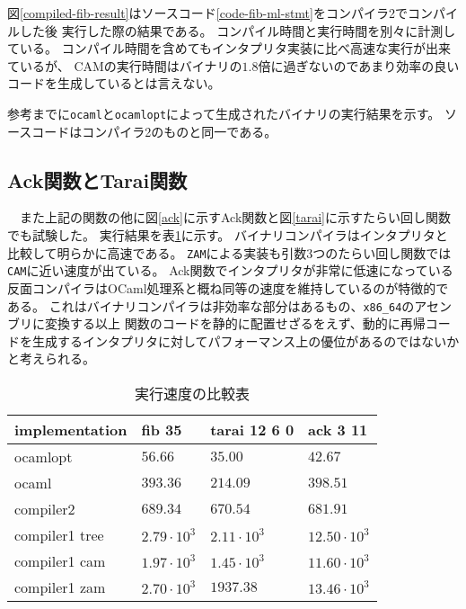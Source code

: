 \documentclass[report]{jlreq}
\begin{document}
      図\ref{compiled-fib-result}はソースコード\ref{code-fib-ml-stmt}をコンパイラ2でコンパイルした後
      実行した際の結果である。
      コンパイル時間と実行時間を別々に計測している。
      コンパイル時間を含めてもインタプリタ実装に比べ高速な実行が出来ているが、
      CAMの実行時間はバイナリの$1.8$倍に過ぎないのであまり効率の良いコードを生成しているとは言えない。
      
      

      参考までに\texttt{ocaml}と\texttt{ocamlopt}によって生成されたバイナリの実行結果を示す。
      ソースコードはコンパイラ2のものと同一である。
      
    \subsection{Ack関数とTarai関数}
    　また上記の関数の他に図\ref{ack}に示すAck関数と図\ref{tarai}に示すたらい回し関数でも試験した。
      実行結果を表\ref{compare-tbl}に示す。
      バイナリコンパイラはインタプリタと比較して明らかに高速である。
	  \texttt{ZAM}による実装も引数3つのたらい回し関数では\texttt{CAM}に近い速度が出ている。
      Ack関数でインタプリタが非常に低速になっている反面コンパイラはOCaml処理系と概ね同等の速度を維持しているのが特徴的である。
      これはバイナリコンパイラは非効率な部分はあるもの、\texttt{x86\_64}のアセンブリに変換する以上
      関数のコードを静的に配置せざるをえず、動的に再帰コードを生成するインタプリタに対してパフォーマンス上の優位があるのではないかと考えられる。
      
      
      \begin{table}[t]
        \centering
        \label{compare-tbl}
        \caption{実行速度の比較表}
        \begin{tabular}{l|lll}
        implementation & fib 35             & tarai 12 6 0         & ack 3 11            \\ \hline
        ocamlopt       & $56.66           $ & $ 35.00            $ & $ 42.67            $ \\
        ocaml          & $393.36          $ & $ 214.09           $ & $ 398.51           $ \\
        compiler2      & $689.34          $ & $ 670.54           $ & $ 681.91           $ \\
        compiler1 tree & $2.79 \cdot 10^3 $ & $ 2.11 \cdot 10^3  $ & $ 12.50 \cdot 10^3 $ \\
        compiler1 cam  & $1.97 \cdot 10^3 $ & $ 1.45 \cdot 10^3  $ & $ 11.60 \cdot 10^3 $ \\
        compiler1 zam  & $2.70 \cdot 10^3 $ & $ 1937.38          $ & $ 13.46 \cdot 10^3 $
        \end{tabular}
      \end{table}
\end{document}
